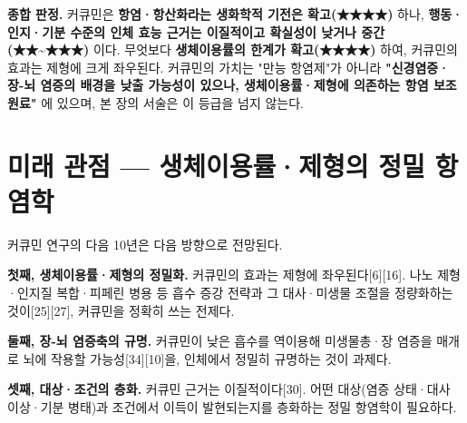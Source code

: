 \documentclass[11pt,oneside]{book}
\begin{document}
\vspace{2pt}\vspace{3pt}

\textbf{종합 판정.} 커큐민은 \textbf{항염·항산화라는 생화학적 기전은 확고(★★★★)} 하나, \textbf{행동·인지·기분 수준의 인체 효능 근거는 이질적이고 확실성이 낮거나 중간(★★\textasciitilde{}★★★)} 이다. 무엇보다 \textbf{생체이용률의 한계가 확고(★★★★)} 하여, 커큐민의 효과는 제형에 크게 좌우된다. 커큐민의 가치는 "만능 항염제"가 아니라 \textbf{"신경염증·장-뇌 염증의 배경을 낮출 가능성이 있으나, 생체이용률·제형에 의존하는 항염 보조 원료"} 에 있으며, 본 장의 서술은 이 등급을 넘지 않는다.

\section{미래 관점 — 생체이용률·제형의 정밀 항염학}
커큐민 연구의 다음 10년은 다음 방향으로 전망된다.

\textbf{첫째, 생체이용률·제형의 정밀화.} 커큐민의 효과는 제형에 좌우된다[6][16]. 나노 제형·인지질 복합·피페린 병용 등 흡수 증강 전략과 그 대사·미생물 조절을 정량화하는 것이[25][27], 커큐민을 정확히 쓰는 전제다.

\textbf{둘째, 장-뇌 염증축의 규명.} 커큐민이 낮은 흡수를 역이용해 미생물총·장 염증을 매개로 뇌에 작용할 가능성[34][10]을, 인체에서 정밀히 규명하는 것이 과제다.

\textbf{셋째, 대상·조건의 층화.} 커큐민 근거는 이질적이다[30]. 어떤 대상(염증 상태·대사 이상·기분 병태)과 조건에서 이득이 발현되는지를 층화하는 정밀 항염학이 필요하다.
\end{document}
